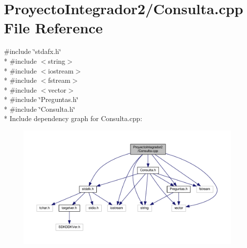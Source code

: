 \section{Proyecto\-Integrador2/\-Consulta.cpp File Reference}
\label{_consulta_8cpp}
{\ttfamily \#include \char`\"{}stdafx.\-h\char`\"{}}\\*
{\ttfamily \#include $<$string$>$}\\*
{\ttfamily \#include $<$iostream$>$}\\*
{\ttfamily \#include $<$fstream$>$}\\*
{\ttfamily \#include $<$vector$>$}\\*
{\ttfamily \#include \char`\"{}Preguntas.\-h\char`\"{}}\\*
{\ttfamily \#include \char`\"{}Consulta.\-h\char`\"{}}\\*
Include dependency graph for Consulta.\-cpp\-:\nopagebreak
\begin{figure}[H]
\begin{center}
\leavevmode
\includegraphics[width=350pt]{_consulta_8cpp__incl}
\end{center}
\end{figure}

